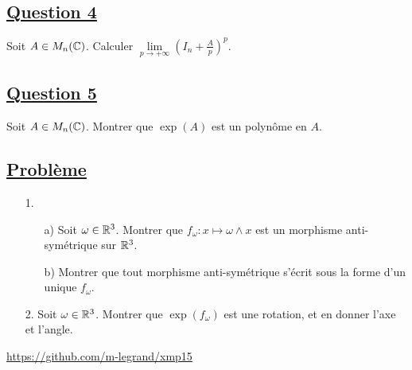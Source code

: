 \documentclass[12pt,a4paper]{report}
\begin{document}
\subsection*{\underline{Question 4}}

Soit $A\in M_n(\mathbb{C})$. Calculer $\lim\limits_{p\rightarrow +\infty}\left(I_n+\frac{A}{p}\right)^p$.

\subsection*{\underline{Question 5}}

Soit $A\in M_n(\mathbb{C})$. Montrer que $\exp(A)$ est un polynôme en $A$.

\subsection*{\underline{Problème}}

\begin{itemize}
\item[1.]
\begin{itemize}
\item[a)] Soit $\omega\in\mathbb{R}^3$. Montrer que $f_\omega : x \mapsto \omega \wedge x$ est un morphisme anti-symétrique sur $\mathbb{R}^3$.
\item[b)] Montrer que tout morphisme anti-symétrique s'écrit sous la forme d'un unique $f_\omega$.
\end{itemize}
\item[2.] Soit $\omega\in\mathbb{R}^3$. Montrer que $\exp(f_\omega)$ est une rotation, et en donner l'axe et l'angle.
\end{itemize}

\vfill

\begin{center}
\url{https://github.com/m-legrand/xmp15}
\end{center}
\end{document}
